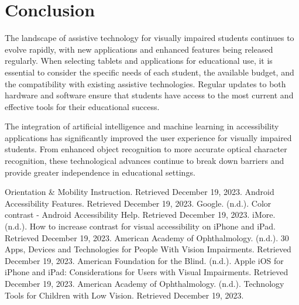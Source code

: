 \section{Conclusion}
\label{sec:conclusion-tablets}
The landscape of assistive technology for visually impaired students continues to evolve rapidly, with new applications and enhanced features being released regularly. When selecting tablets and applications for educational use, it is essential to consider the specific needs of each student, the available budget, and the compatibility with existing assistive technologies. Regular updates to both hardware and software ensure that students have access to the most current and effective tools for their educational success.

The integration of artificial intelligence and machine learning in accessibility applications has significantly improved the user experience for visually impaired students. From enhanced object recognition to more accurate optical character recognition, these technological advances continue to break down barriers and provide greater independence in educational settings.

\begin{thebibliography}{99}
 Orientation \& Mobility Instruction. Retrieved December 19, 2023.
 Android Accessibility Features. Retrieved December 19, 2023.
 Google. (n.d.). Color contrast - Android Accessibility Help. Retrieved December 19, 2023.
 iMore. (n.d.). How to increase contrast for visual accessibility on iPhone and iPad. Retrieved December 19, 2023.
 American Academy of Ophthalmology. (n.d.). 30 Apps, Devices and Technologies for People With Vision Impairments. Retrieved December 19, 2023.
 American Foundation for the Blind. (n.d.). Apple iOS for iPhone and iPad: Considerations for Users with Visual Impairments. Retrieved December 19, 2023.
 American Academy of Ophthalmology. (n.d.). Technology Tools for Children with Low Vision. Retrieved December 19, 2023.
\end{thebibliography}
